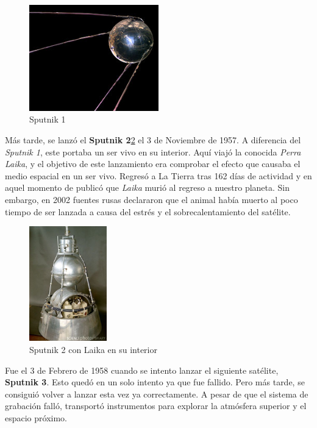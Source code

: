 \documentclass[paper=a4, fontsize=11pt]{scrartcl}
\begin{document}
\begin{figure}[H]
\begin{center}
  \includegraphics[width=0.5\textwidth]{imagenes/s1.jpg}
  \caption{Sputnik 1}
  \label{s1}
\end{center}
\end{figure}

Más tarde, se lanzó el \textbf{Sputnik 2}\ref{s2} el 3 de Noviembre de 1957. A diferencia del \textit{Sputnik 1}, este portaba un ser vivo en su interior. Aquí viajó la conocida \textit{Perra Laika}, y el objetivo de este lanzamiento era comprobar el efecto que causaba el medio espacial en un ser vivo. Regresó a La Tierra tras 162 días de actividad y en aquel momento de publicó que \textit{Laika} murió al regreso a nuestro planeta. Sin embargo, en 2002 fuentes rusas declararon que el animal había muerto al poco tiempo de ser lanzada a causa del estrés y el sobrecalentamiento del satélite.\\

\begin{figure}[H]
\begin{center}
  \includegraphics[width=0.3\textwidth]{imagenes/s2.jpg}
  \caption{Sputnik 2 con Laika en su interior}
  \label{s2}
\end{center}
\end{figure}

Fue el 3 de Febrero de 1958 cuando se intento lanzar el siguiente satélite, \textbf{Sputnik 3}. Esto quedó en un solo intento ya que fue fallido. Pero más tarde, se consiguió volver a lanzar esta vez ya correctamente. A pesar de que el sistema de grabación falló, transportó instrumentos para explorar la atmósfera superior y el espacio próximo.\\
\end{document}
